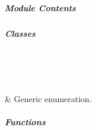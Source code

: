\documentclass[letterpaper,10pt,english]{sphinxmanual}
\begin{document}
\subparagraph{Module Contents}
\label{\detokenize{autoapi/pine/backend/log/index:module-contents}}

\subparagraph{Classes}
\label{\detokenize{autoapi/pine/backend/log/index:classes}}

\begin{savenotes}\sphinxatlongtablestart\begin{longtable}[c]{}
\hline

\endfirsthead

%
{}\\
\hline

\endhead

\hline
{}\\
\endfoot

\endlastfoot

\sphinxAtStartPar
{\hyperref[\detokenize{autoapi/pine/backend/log/index:pine.backend.log.Action}]{}}
&
\sphinxAtStartPar
Generic enumeration.
\\
\hline
\end{longtable}\sphinxatlongtableend\end{savenotes}


\subparagraph{Functions}
\label{\detokenize{autoapi/pine/backend/log/index:functions}}
\end{document}
